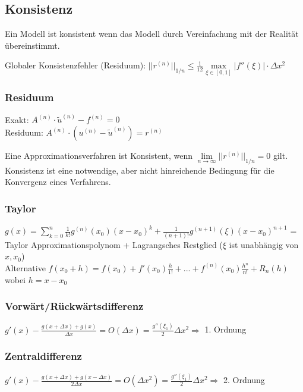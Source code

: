 \subsection{Konsistenz}
Ein Modell ist konsistent wenn das Modell durch Vereinfachung mit der Realität übereinstimmt.

Globaler Konsistenzfehler (Residuum): $\boxed{||r^{(n)}||_{1/n}\leq \frac 1{12}\max\limits_{\xi\in[0,1]}|f''(\xi)|\cdot \Delta x^2}$

\subsubsection{Residuum}
Exakt: $A^{(n)}\cdot \tilde{u}^{(n)}-f^{(n)}=0$\\
Residuum: $A^{(n)}\cdot (u^{(n)}-\tilde{u}^{(n)})=r^{(n)}$

Eine Approximationsverfahren ist Konsistent, wenn $\boxed{\lim\limits_{n\rightarrow \infty}||r^{(n)}||_{1/n}=0}$ gilt.\\

Konsistenz ist eine notwendige, aber nicht hinreichende Bedingung für die Konvergenz eines Verfahrens.

\subsubsection{Taylor}
$g(x)= \sum\limits_{k=0}^n\frac{1}{k!} g^{(n)}(x_0)(x-x_0)^k +
\frac{1}{(n+1)!}g^{(n+1)}(\xi)(x-x_0)^{n+1}$ = Taylor
Approximationspolynom  + Lagrangsches Restglied ($\xi$ ist unabhängig von $x,x_0$)\\

Alternative
$ f(x_0+h)=f(x_0)+f'(x_0)\frac{h}{1!}+...+f^{(n)}(x_0)\frac{h^n}{n!}+R_n(h) $ wobei $ h = x - x_0 $




\subsubsection{Vorwärt/Rückwärtsdifferenz}
$g'(x) - \frac{g(x+\Delta x) + g(x)}{\Delta x}= O(\Delta x) = 
\frac{g''(\xi_1)}{2}\Delta x^2 \Rightarrow$  1. Ordnung


\subsubsection{Zentraldifferenz}
$g'(x) - \frac{g(x+\Delta x) + g(x-\Delta x)}{2\Delta x}= O(\Delta x^2) = 
\frac{g''(\xi_1)}{2}\Delta x^2 \Rightarrow$ 2. Ordnung



